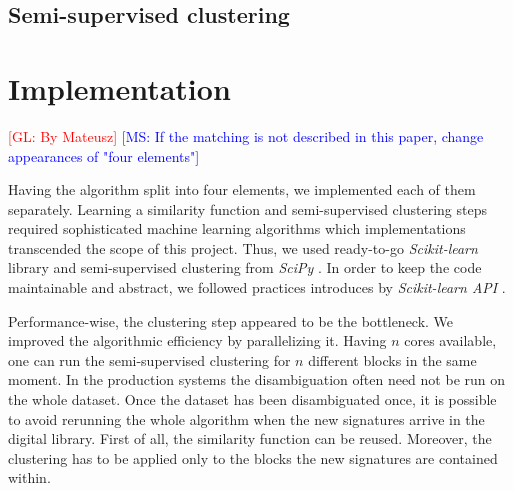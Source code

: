 \documentclass{article}
\newcommand{\glnote}[1]{\textcolor{red}{[GL: #1]}}
\newcommand{\msnote}[1]{\textcolor{blue}{[MS: #1]}}
\begin{document}

\subsection{Semi-supervised clustering}




\section{Implementation}
\label{implementation}

\glnote{By Mateusz}
\msnote{If the matching is not described in this paper, change appearances of "four elements"}

Having the algorithm split into four elements, we implemented each of them separately.
Learning a similarity function and semi-supervised clustering steps required sophisticated
machine learning algorithms which implementations transcended the scope of this project.
Thus, we used ready-to-go \textit{Scikit-learn} library \citep{scikit-learn} and
semi-supervised clustering from \textit{SciPy} \citep{scipy}. In order to keep the code
maintainable and abstract, we followed practices introduces by \textit{Scikit-learn API}
\citep{scikit-learn-API}.

Performance-wise, the clustering step appeared to be the bottleneck. We improved the
algorithmic efficiency by parallelizing it. Having $n$ cores available, one can run the
semi-supervised clustering for $n$ different blocks in the same moment. In the production
systems the disambiguation often need not be run on the whole dataset. Once the dataset has
been disambiguated once, it is possible to avoid rerunning the whole algorithm when the new
signatures arrive in the digital library. First of all, the similarity function can be
reused. Moreover, the clustering has to be applied only to the blocks the new signatures are
contained within.
\end{document}
